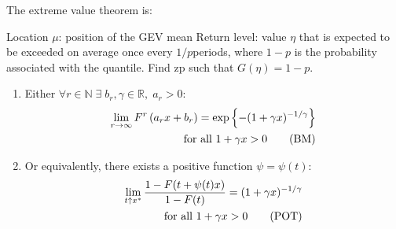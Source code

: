 The extreme value theorem is:




Location $\mu$: position of the GEV mean
Return level: value $\eta$ that is expected to
be exceeded on average once every $1/p $periods,
where $1 − p$ is the probability associated with the quantile.
Find zp such that $G(\eta) = 1 -  p$.


\begin{enumerate}
  \item Either $\forall r \in \mathbb{N} \;\exists \;b_r, \gamma\in \mathbb{R},\; a_r>0: $
    \begin{eqnarray}
    \lim _{r \rightarrow \infty} F^{r}\left(a_{r} x+b_{r}\right)=\exp \left\{-(1+\gamma x)^{-1 / \gamma}\right\} \notag \\
     \text { for all } 1+\gamma x>0
    \tag{BM}
    \end{eqnarray}

  \item Or equivalently, there exists a positive function $\psi=\psi (t):$
    \begin{eqnarray}
    \lim _{t \uparrow x^{*}} \frac{1-F(t+\psi(t) x)}{1-F(t)}=(1+\gamma x)^{-1 / \gamma} \notag \\
    \text { for all } 1+\gamma x>0
    \tag{POT}
    \end{eqnarray}
 \end{enumerate}
